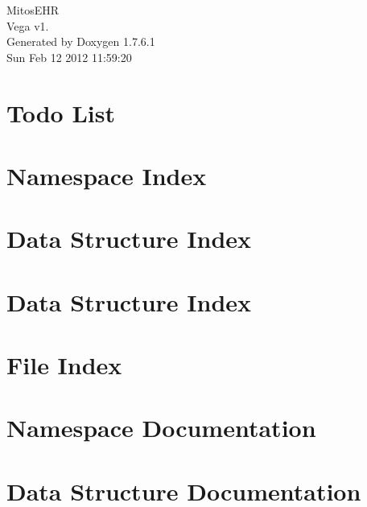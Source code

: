 \documentclass[a4paper]{book}
\begin{document}
\hypersetup{pageanchor=false,citecolor=blue}
\begin{titlepage}
\vspace*{7cm}
\begin{center}
{\Large \-Mitos\-E\-H\-R \\[1ex]\large \-Vega v1. }\\
\vspace*{1cm}
{\large \-Generated by Doxygen 1.7.6.1}\\
\vspace*{0.5cm}
{\small Sun Feb 12 2012 11:59:20}\\
\end{center}
\end{titlepage}
\clearemptydoublepage
{}
\tableofcontents
\clearemptydoublepage
{}
\hypersetup{pageanchor=true,citecolor=blue}
\chapter{\-Todo \-List}
\label{todo}
\hypertarget{todo}{}

\chapter{\-Namespace \-Index}

\chapter{\-Data \-Structure \-Index}

\chapter{\-Data \-Structure \-Index}

\chapter{\-File \-Index}

\chapter{\-Namespace \-Documentation}

\chapter{\-Data \-Structure \-Documentation}

























\end{document}
